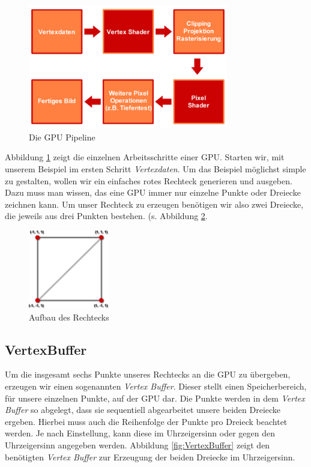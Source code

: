 \begin{Spacing}{\mylinespace}
\begin{figure}[h!]
	\vspace*{20px}
	\centering
	\includegraphics[width=330px]{graphics/pipeline.png}	
	\caption{Die GPU Pipeline}
	\label{fig:pipeline}
\end{figure}

Abbildung \ref{fig:pipeline} zeigt die einzelnen Arbeitsschritte einer GPU. Starten wir, mit unserem Beispiel im ersten Schritt \textit{Vertexdaten}. Um das Beispiel möglichst simple zu gestalten, wollen wir ein einfaches rotes Rechteck generieren und ausgeben. Dazu muss man wissen, das eine GPU immer nur einzelne Punkte oder Dreiecke zeichnen kann. Um unser Rechteck zu erzeugen benötigen wir also zwei Dreiecke, die jeweils aus drei Punkten bestehen. (s. Abbildung \ref{fig:Viereck}.

\begin{figure}[h!]
	\vspace*{30px}
	\centering
	\includegraphics[height=130px]{graphics/Quad2.png}	
	\caption{Aufbau des Rechtecks}
	\label{fig:Viereck}
\end{figure}

\subsection{VertexBuffer}
Um die insgesamt sechs Punkte unseres Rechtecks an die GPU zu übergeben, erzeugen wir einen sogenannten \textit{Vertex Buffer}. Dieser stellt einen Speicherbereich, für unsere einzelnen Punkte, auf der GPU dar. Die Punkte werden in dem \textit{Vertex Buffer} so abgelegt, dass sie sequentiell abgearbeitet unsere beiden Dreiecke ergeben. Hierbei muss auch die Reihenfolge der Punkte pro Dreieck beachtet werden. Je nach Einstellung, kann diese im Uhrzeigersinn oder gegen den Uhrzeigersinn angegeben werden. Abbildung \ref{fig:VertexBuffer} zeigt den benötigten \textit{Vertex Buffer} zur Erzeugung der beiden Dreiecke im Uhrzeigersinn.


\end{Spacing}
